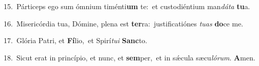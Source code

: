 {\numbfont\textcolor{\numbcolor}{15.}}~Párticeps ego sum ómnium timénti\textbf{um} te:~\star et custodiéntium man\-\textit{dá}\-\textit{ta} \textbf{tu}\-a.\par
{\numbfont\textcolor{\numbcolor}{16.}}~Misericórdia tua, Dómine, plena est \textbf{ter}\-ra:~\star justificatiónes \textit{tu}\-\textit{as} \textbf{do}\-ce me.\par
{\numbfont\textcolor{\numbcolor}{17.}}~Glória Patri, et \textbf{Fí}\-lio,~\star et Spirí\-\textit{tu}\-\textit{i} \textbf{Sanc}\-to.\par
{\numbfont\textcolor{\numbcolor}{18.}}~Sicut erat in princípio, et nunc, et \textbf{sem}\-per,~\star et in sǽcula sæcu\-\textit{ló}\-\textit{rum}. \textbf{A}\-men.\par
